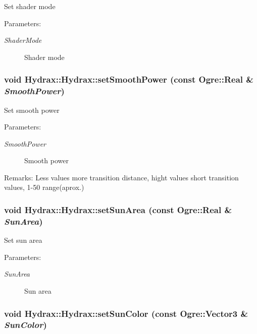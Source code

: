 Set shader mode \begin{Desc}
\item[Parameters:]
\begin{description}
\item[{\em ShaderMode}]Shader mode \end{description}
\end{Desc}
\hypertarget{class_hydrax_1_1_hydrax_a8f4c456888deffc3cbe523c0666a66b}{
\subsubsection[{setSmoothPower}]{\setlength{\rightskip}{0pt plus 5cm}void Hydrax::Hydrax::setSmoothPower (const Ogre::Real \& {\em SmoothPower})}}
\label{class_hydrax_1_1_hydrax_a8f4c456888deffc3cbe523c0666a66b}


Set smooth power \begin{Desc}
\item[Parameters:]
\begin{description}
\item[{\em SmoothPower}]Smooth power \end{description}
\end{Desc}
\begin{Desc}
\item[Remarks:]Less values more transition distance, hight values short transition values, 1-50 range(aprox.) \end{Desc}
\hypertarget{class_hydrax_1_1_hydrax_276bb2f6256badf7c3a72fd758732e00}{
\subsubsection[{setSunArea}]{\setlength{\rightskip}{0pt plus 5cm}void Hydrax::Hydrax::setSunArea (const Ogre::Real \& {\em SunArea})}}
\label{class_hydrax_1_1_hydrax_276bb2f6256badf7c3a72fd758732e00}


Set sun area \begin{Desc}
\item[Parameters:]
\begin{description}
\item[{\em SunArea}]Sun area \end{description}
\end{Desc}
\hypertarget{class_hydrax_1_1_hydrax_dc74459b43cd00a19b60b8391531cb17}{
\subsubsection[{setSunColor}]{\setlength{\rightskip}{0pt plus 5cm}void Hydrax::Hydrax::setSunColor (const Ogre::Vector3 \& {\em SunColor})}}
\label{class_hydrax_1_1_hydrax_dc74459b43cd00a19b60b8391531cb17}


